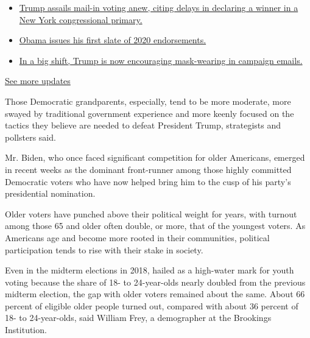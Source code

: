 \begin{itemize}
\tightlist
\item
  \href{https://www.nytimes3xbfgragh.onion/2020/08/03/us/elections/biden-vs-trump.html?action=click\&pgtype=Article\&state=default\&region=MAIN_CONTENT_1\&context=storylines_live_updates\#link-6494b448}{Trump
  assails mail-in voting anew, citing delays in declaring a winner in a
  New York congressional primary.}
\item
  \href{https://www.nytimes3xbfgragh.onion/2020/08/03/us/elections/biden-vs-trump.html?action=click\&pgtype=Article\&state=default\&region=MAIN_CONTENT_1\&context=storylines_live_updates\#link-3de249e6}{Obama
  issues his first slate of 2020 endorsements.}
\item
  \href{https://www.nytimes3xbfgragh.onion/2020/08/03/us/elections/biden-vs-trump.html?action=click\&pgtype=Article\&state=default\&region=MAIN_CONTENT_1\&context=storylines_live_updates\#link-54e34d20}{In
  a big shift, Trump is now encouraging mask-wearing in campaign
  emails.}
\end{itemize}

\href{https://www.nytimes3xbfgragh.onion/2020/08/03/us/elections/biden-vs-trump.html?action=click\&pgtype=Article\&state=default\&region=MAIN_CONTENT_1\&context=storylines_live_updates}{See
more updates}

Those Democratic grandparents, especially, tend to be more moderate,
more swayed by traditional government experience and more keenly focused
on the tactics they believe are needed to defeat President Trump,
strategists and pollsters said.

Mr. Biden, who once faced significant competition for older Americans,
emerged in recent weeks as the dominant front-runner among those highly
committed Democratic voters who have now helped bring him to the cusp of
his party's presidential nomination.

Older voters have punched above their political weight for years, with
turnout among those 65 and older often double, or more, that of the
youngest voters. As Americans age and become more rooted in their
communities, political participation tends to rise with their stake in
society.

Even in the midterm elections in 2018, hailed as a high-water mark for
youth voting because the share of 18- to 24-year-olds nearly doubled
from the previous midterm election, the gap with older voters remained
about the same. About 66 percent of eligible older people turned out,
compared with about 36 percent of 18- to 24-year-olds, said William
Frey, a demographer at the Brookings Institution.

